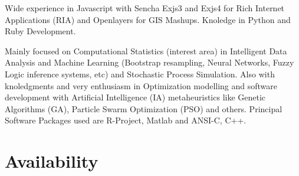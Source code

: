 \documentclass[11pt,letterpaper,roman]{moderncv}
\begin{document}
 {Wide experience in Javascript with Sencha
Exjs3 and Exjs4 for Rich Internet Applications (RIA) and Openlayers for GIS
Mashups. Knoledge in Python and Ruby Development.}

	{Mainly focused on Computational Statistics (interest area) in
	Intelligent Data Analysis and Machine Learning (Bootstrap resampling, Neural
	Networks, Fuzzy Logic inference systems, etc)  and Stochastic Process
	Simulation. Also with knoledgments and very enthusiasm in Optimization modelling
	and software development with Artificial Intelligence (IA) metaheuristics like
	Genetic Algorithms (GA), Particle Swarm Optimization (PSO) and others. Principal
	Software Packages used are R-Project, Matlab and ANSI-C, C++.}

\section{Availability} 
\end{document}
